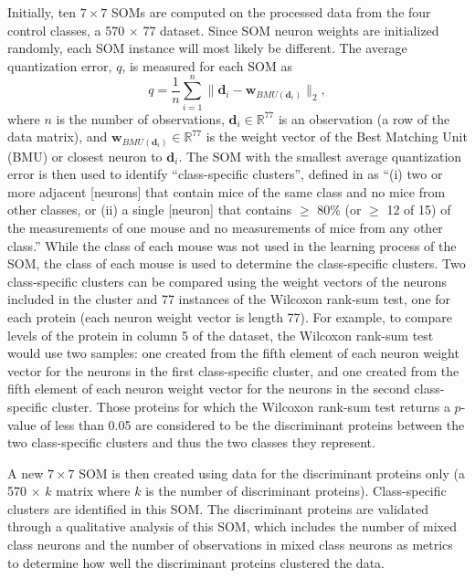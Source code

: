 \documentclass[12pt]{article}
\begin{document}
Initially, ten $7 \times 7$ SOMs are computed on the processed data from the four control classes, a 570 $\times$ 77 dataset. Since SOM neuron weights are initialized randomly, each SOM instance will most likely be different. The average quantization error, $q$, is measured for each SOM as  
\[
q = \frac{1}{n} \sum_{i=1}^n \|\mathbf{d}_i - \mathbf{w}_{BMU(\mathbf{d}_i)}\|_2, 
\]
where $n$ is the number of observations, $\mathbf{d}_i \in \mathbb{R}^{77}$ is an observation (a row of the data matrix), and $\mathbf{w}_{BMU(\mathbf{d}_i)} \in \mathbb{R}^{77}$ is the weight vector of the Best Matching Unit (BMU) or closest neuron to $\mathbf{d}_i$.  The SOM with the smallest average quantization error is then used to identify ``class-specific clusters'', defined in \cite{higuera_et_al_2015} as ``(i) two or more adjacent [neurons] that contain mice of the same class and no mice from other classes, or (ii) a single [neuron] that contains $\geq$ 80\% (or $\geq$ 12 of 15) of the measurements of one mouse and no measurements of mice from any other class.'' While the class of each mouse was not used in the learning process of the SOM, the class of each mouse is used to determine the class-specific clusters.  Two class-specific clusters can be compared using the weight vectors of the neurons included in the cluster and 77 instances of the Wilcoxon rank-sum test, one for each protein (each neuron weight vector is length 77).  For example, to compare levels of the protein in column 5 of the dataset, the Wilcoxon rank-sum test would use two samples: one created from the fifth element of each neuron weight vector for the neurons in the first class-specific cluster, and one created from the fifth element of each neuron weight vector for the neurons in the second class-specific cluster.  Those proteins for which the Wilcoxon rank-sum test returns a $p$-value of less than 0.05 are considered to be the discriminant proteins between the two class-specific clusters and thus the two classes they represent. 

A new $7 \times 7$ SOM is then created using data for the discriminant proteins only (a 570 $\times$ $k$ matrix where $k$ is the number of discriminant proteins). Class-specific clusters are identified in this SOM. The discriminant proteins are validated through a qualitative analysis of this SOM, which includes the number of mixed class neurons and the number of observations in mixed class neurons as metrics to determine how well the discriminant proteins clustered the data.   
\end{document}
